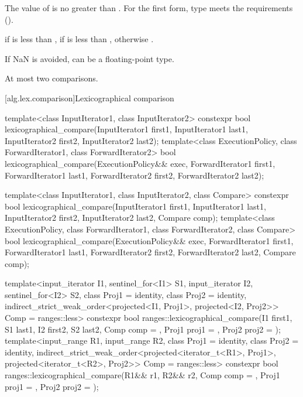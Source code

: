 \begin{itemdescr}
\pnum
\expects
The value of  is no greater than .
For the first form, type 
meets the 
requirements ().

\pnum
\returns
{} if  is less than ,
 if  is less than ,
otherwise .

\pnum
\begin{note}
If NaN is avoided,  can be a floating-point type.
\end{note}

\pnum
\complexity
At most two comparisons.
\end{itemdescr}

[alg.lex.comparison]{Lexicographical comparison}

%
\begin{itemdecl}
template<class InputIterator1, class InputIterator2>
  constexpr bool
    lexicographical_compare(InputIterator1 first1, InputIterator1 last1,
                            InputIterator2 first2, InputIterator2 last2);
template<class ExecutionPolicy, class ForwardIterator1, class ForwardIterator2>
  bool
    lexicographical_compare(ExecutionPolicy&& exec,
                            ForwardIterator1 first1, ForwardIterator1 last1,
                            ForwardIterator2 first2, ForwardIterator2 last2);

template<class InputIterator1, class InputIterator2, class Compare>
  constexpr bool
    lexicographical_compare(InputIterator1 first1, InputIterator1 last1,
                            InputIterator2 first2, InputIterator2 last2,
                            Compare comp);
template<class ExecutionPolicy, class ForwardIterator1, class ForwardIterator2,
         class Compare>
  bool
    lexicographical_compare(ExecutionPolicy&& exec,
                            ForwardIterator1 first1, ForwardIterator1 last1,
                            ForwardIterator2 first2, ForwardIterator2 last2,
                            Compare comp);

template<input_iterator I1, sentinel_for<I1> S1, input_iterator I2, sentinel_for<I2> S2,
         class Proj1 = identity, class Proj2 = identity,
         indirect_strict_weak_order<projected<I1, Proj1>,
                                    projected<I2, Proj2>> Comp = ranges::less>
  constexpr bool
    ranges::lexicographical_compare(I1 first1, S1 last1, I2 first2, S2 last2,
                                    Comp comp = {}, Proj1 proj1 = {}, Proj2 proj2 = {});
template<input_range R1, input_range R2, class Proj1 = identity,
         class Proj2 = identity,
         indirect_strict_weak_order<projected<iterator_t<R1>, Proj1>,
                                    projected<iterator_t<R2>, Proj2>> Comp = ranges::less>
  constexpr bool
    ranges::lexicographical_compare(R1&& r1, R2&& r2, Comp comp = {},
                                    Proj1 proj1 = {}, Proj2 proj2 = {});
\end{itemdecl}

